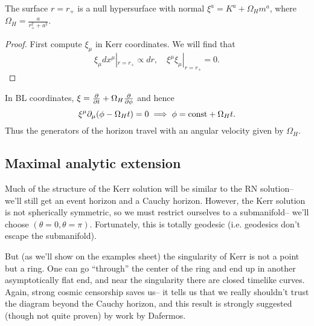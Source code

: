 \begin{prop}
    The surface $r=r_+$ is a null hypersurface with normal $\xi^a = K^a + \Omega_H m^a$, where $\Omega_H=\frac{a}{r_+^2 + a^2}$.
\end{prop}
\begin{proof}
    First compute $\xi_\mu$ in Kerr coordinates. We will find that
    \begin{equation*}
        \xi_\mu dx^\mu|_{r=r_+} \propto dr, \quad \xi^\mu \xi_\mu|_{r=r_+} =0.
    \end{equation*}
\end{proof}
In BL coordinates, $\xi=\P{}{t} +\Omega_H \P{}{\phi}$ and hence
\begin{equation}
    \xi^\mu \p_\mu(\phi-\Omega_H t) = 0\implies \phi=\text{const} + \Omega_H t.
\end{equation}
Thus the generators of the horizon travel with an angular velocity given by $\Omega_H$.

\subsection*{Maximal analytic extension}
Much of the structure of the Kerr solution will be similar to the RN solution-- we'll still get an event horizon and a Cauchy horizon. However, the Kerr solution is not spherically symmetric, so we must restrict ourselves to a submanifold-- we'll choose $(\theta=0,\theta=\pi)$. Fortunately, this is totally geodesic (i.e. geodesics don't escape the submanifold).

But (as we'll show on the examples sheet) the singularity of Kerr is not a point but a ring. One can go ``through'' the center of the ring and end up in another asymptotically flat end, and near the singularity there are closed timelike curves. Again, strong cosmic censorship saves us-- it tells us that we really shouldn't trust the diagram beyond the Cauchy horizon, and this result is strongly suggested (though not quite proven) by work by Dafermos.

